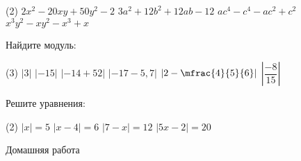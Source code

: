 \begin{class}[number=3]
\begin{listofex}
		\begin{tasks}(2)
			\task \( 2x^2-20xy+50y^2-2 \)
			\task \( 3a^2+12b^2+12ab-12 \)
			\task \( ac^4-c^4-ac^2+c^2 \)
			\task \( x^3y^2-xy^2-x^3+x \)
		\end{tasks}
		\item Найдите модуль:
		\begin{tasks}(3)
			\task \(  |3| \)
			\task \(  |-15| \)
			\task \( |-14+52|  \)
			\task \( |-17-5,7|  \)
			\task \(  \left|2-\mfrac{4}{5}{6}\right| \)
			\task \(  \left|\dfrac{-8}{15}\right| \)
		\end{tasks}
		\item Решите уравнения:
		\begin{tasks}(2)
			\task \( |x|=5 \)
			\task \( |x-4|=6 \)
			\task \( |7-x|=12 \)
			\task \( |5x-2|=20 \)
		\end{tasks}
	\end{listofex}
\end{class}

\begin{homework}[number=3]
	\begin{listofex}
		\item Домашняя работа
	\end{listofex}
\end{homework}

